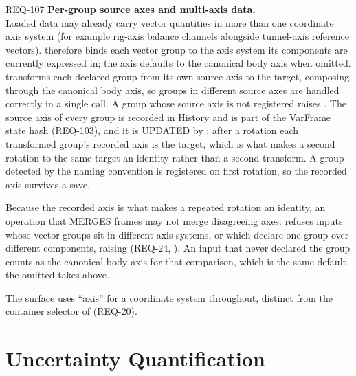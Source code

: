 \begin{reqbox}{REQ-107}{\stable}
\textbf{Per-group source axes and multi-axis data.}\\
Loaded data may already carry vector quantities in more than one
coordinate axis system (for example rig-axis balance channels
alongside tunnel-axis reference vectors).  therefore binds each vector group to the
axis system its components are currently expressed in; the axis
defaults to the canonical body axis when omitted. 
transforms each declared group from its own source axis to the
target, composing through the canonical body axis, so groups in
different source axes are handled correctly in a single call. A
group whose source axis is not registered raises
. The source axis of every group is recorded
in History and is part of the VarFrame state hash (REQ-103), and
it is UPDATED by : after a rotation each transformed
group's recorded axis is the target, which is what makes a second
rotation to the same target an identity rather than a second
transform. A group detected by the naming convention is registered on
first rotation, so the recorded axis survives a save.

Because the recorded axis is what makes a repeated rotation an identity,
an operation that MERGES frames may not merge disagreeing axes:
 refuses inputs whose vector groups sit in different
axis systems, or which declare one group over different components,
raising  (REQ-24, ). An input that never
declared the group counts as the canonical body axis for that
comparison, which is the same default the omitted  takes
above.

The surface uses ``axis'' for a coordinate system throughout, distinct
from the  container selector of 
(REQ-20).
\end{reqbox}

\section{Uncertainty Quantification}
\label{sec:uq}

